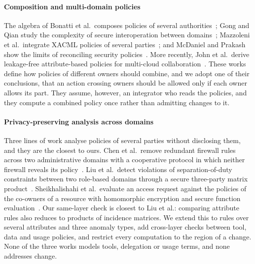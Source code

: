 \paragraph{Composition and multi-domain policies} The algebra of Bonatti et al.\ composes policies of several authorities~\cite{bonatti2002algebra}; Gong and Qian study the complexity of secure interoperation between domains~\cite{gong1996interop}; Mazzoleni et al.\ integrate XACML policies of several parties~\cite{mazzoleni2008integration}; and McDaniel and Prakash show the limits of reconciling security policies~\cite{mcdaniel2006reconciliation}. More recently, John et al.\ derive leakage-free attribute-based policies for multi-cloud collaboration~\cite{john2026multicloud}. These works define how policies of different owners should combine, and we adopt one of their conclusions, that an action crossing owners should be allowed only if each owner allows its part. They assume, however, an integrator who reads the policies, and they compute a combined policy once rather than admitting changes to it.

\paragraph{Privacy-preserving analysis across domains} Three lines of work analyse policies of several parties without disclosing them, and they are the closest to ours. Chen et al.\ remove redundant firewall rules across two administrative domains with a cooperative protocol in which neither firewall reveals its policy~\cite{chen2013firewall}. Liu et al.\ detect violations of separation-of-duty constraints between two role-based domains through a secure three-party matrix product~\cite{liu2020smer}. Sheikhalishahi et al.\ evaluate an access request against the policies of the co-owners of a resource with homomorphic encryption and secure function evaluation~\cite{sheikhalishahi2019multiparty}. Our same-layer check is closest to Liu et al.: comparing attribute rules also reduces to products of incidence matrices. We extend this to rules over several attributes and three anomaly types, add cross-layer checks between tool, data and usage policies, and restrict every computation to the region of a change. None of the three works models tools, delegation or usage terms, and none addresses change.

